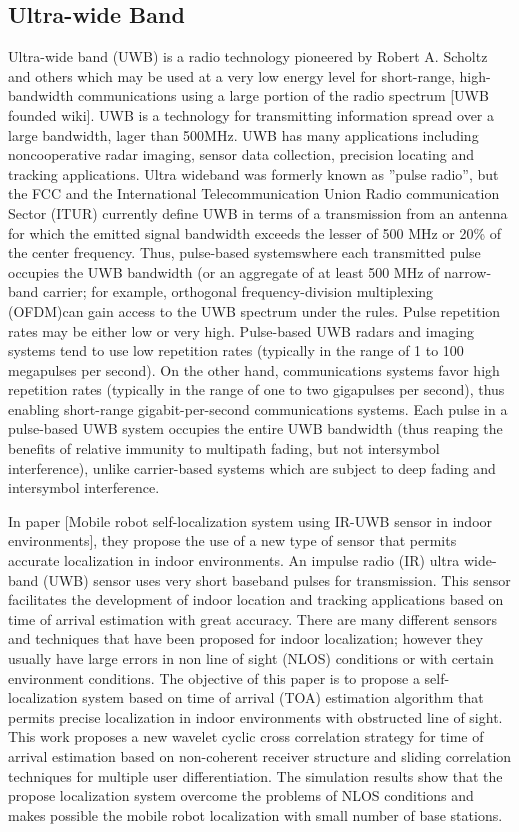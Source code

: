 \documentclass[12pt]{report}
\begin{document}
\subsection{Ultra-wide Band}
Ultra-wide band (UWB) is a radio technology pioneered by Robert A. Scholtz and others which may be used at a very low energy level for short-range, high-bandwidth communications using a large portion of the radio spectrum [UWB founded wiki]. UWB is a technology for transmitting information spread over a large bandwidth, lager than 500MHz. UWB has many applications including noncooperative radar imaging, sensor data collection, precision locating and tracking applications. Ultra wideband was formerly known as ”pulse radio”, but the FCC and the International Telecommunication Union Radio communication Sector (ITUR) currently define UWB in terms of a transmission from an antenna for which the emitted signal bandwidth exceeds the lesser of 500 MHz or 20\% of the center frequency. Thus, pulse-based systemswhere each transmitted pulse occupies the UWB bandwidth (or an aggregate of at least 500 MHz of narrow-band carrier; for example, orthogonal frequency-division multiplexing (OFDM)can gain access to the UWB spectrum under the rules. Pulse repetition rates may be either low or very high. Pulse-based UWB radars and imaging systems tend to use low repetition rates (typically in the range of 1 to 100 megapulses per second). On the other hand, communications systems favor high repetition rates (typically in the range of one to two gigapulses per second), thus enabling short-range gigabit-per-second communications systems. Each pulse in a pulse-based UWB system occupies the entire UWB bandwidth (thus reaping the benefits of relative immunity to multipath fading, but not intersymbol interference), unlike carrier-based systems which are subject to deep fading and intersymbol interference.

In paper [Mobile robot self-localization system using IR-UWB sensor in indoor environments], they propose the use of a new type of sensor that permits accurate localization in indoor environments. An impulse radio (IR) ultra wide-band (UWB) sensor uses very short baseband pulses for transmission. This sensor facilitates the development of indoor location and tracking applications based on time of arrival estimation with great accuracy. There are many different sensors and techniques that have been proposed for indoor localization; however they usually have large errors in non line of sight (NLOS) conditions or with certain environment conditions. The objective of this paper is to propose a self-localization system based on time of arrival (TOA) estimation algorithm that permits precise localization in indoor environments with obstructed line of sight. This work proposes a new wavelet cyclic cross correlation strategy for time of arrival estimation based on non-coherent receiver structure and sliding correlation techniques for multiple user differentiation. The simulation results show that the propose localization system overcome the problems of NLOS conditions and makes possible the mobile robot localization with small number of base stations.
\end{document}
